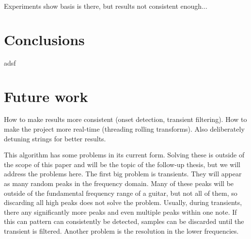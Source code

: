 \documentclass[10pt,twocolumn]{article}
\begin{document}
Experiments show basis is there, but results not consistent enough...



\section{Conclusions}
adsf


\section{Future work}  \label{sec:future}
How to make results more consistent (onset detection, transient filtering). How to make the project more real-time (threading rolling transforms). Also deliberately detuning strings for better results.

This algorithm has some problems in its current form. Solving these is outside of the scope of this paper and will be the topic of the follow-up thesis, but we will address the problems here. The first big problem is transients. They will appear as many random peaks in the frequency domain. Many of these peaks will be outside of the fundamental frequency range of a guitar, but not all of them, so discarding all high peaks does not solve the problem. Usually, during transients, there any significantly more peaks and even multiple peaks within one note. If this can pattern can consistently be detected, samples can be discarded until the transient is filtered. Another problem is the resolution in the lower frequencies.





\end{document}
